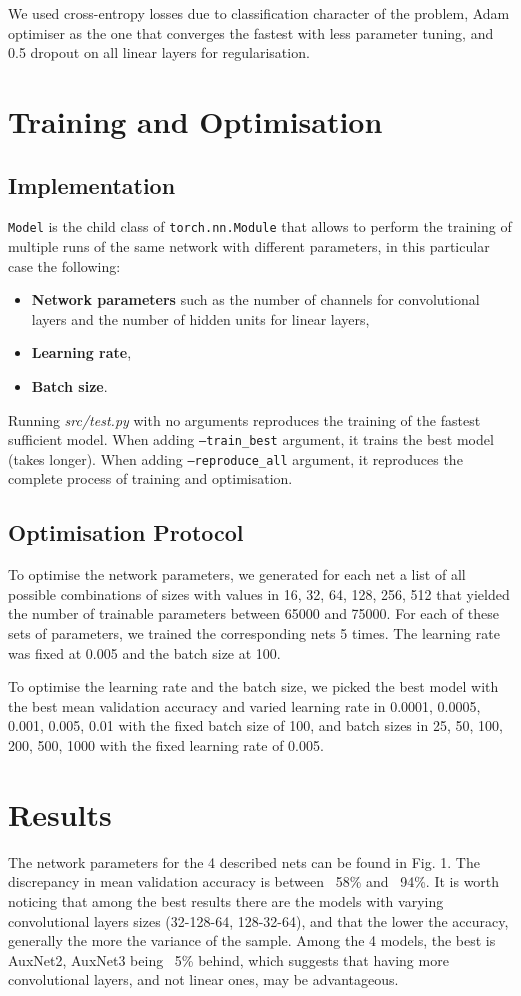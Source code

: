 \documentclass[10pt,conference,compsocconf]{IEEEtran}
\begin{document}
We used cross-entropy losses due to classification character of the problem, Adam optimiser as the one that converges the fastest with less parameter tuning, and 0.5 dropout on all linear layers for regularisation.

\section{Training and Optimisation}
\subsection{Implementation}
\texttt{Model} is the child class of \texttt{torch.nn.Module} that allows to perform the training of multiple runs of the same network with different parameters, in this particular case the following:
\begin{itemize}
    \item \textbf{Network parameters} such as the number of channels for convolutional layers and the number of hidden units for linear layers,
    \item \textbf{Learning rate},
    \item \textbf{Batch size}.
\end{itemize}
Running \textit{src/test.py} with no arguments reproduces the training of the fastest sufficient model. When adding \texttt{--train\_best} argument, it trains the best model (takes longer). When adding \texttt{--reproduce\_all} argument, it reproduces the complete process of training and optimisation.

\subsection{Optimisation Protocol}
To optimise the network parameters, we generated for each net a list of all possible combinations of sizes with values in {16, 32, 64, 128, 256, 512} that yielded the number of trainable parameters between 65000 and 75000. For each of these sets of parameters, we trained the corresponding nets 5 times. The learning rate was fixed at 0.005 and the batch size at 100.

To optimise the learning rate and the batch size, we picked the best model with the best mean validation accuracy and varied learning rate in {0.0001, 0.0005, 0.001, 0.005, 0.01} with the fixed batch size of 100, and batch sizes in {25, 50, 100, 200, 500, 1000} with the fixed learning rate of 0.005.

\section{Results}
The network parameters for the 4 described nets can be found in Fig. 1. The discrepancy in mean validation accuracy is between ~58\% and ~94\%. It is worth noticing that among the best results there are the models with varying convolutional layers sizes (32-128-64, 128-32-64), and that the lower the accuracy, generally the more the variance of the sample. Among the 4 models, the best is AuxNet2, AuxNet3 being ~5\% behind, which suggests that having more convolutional layers, and not linear ones, may be advantageous.
\end{document}
